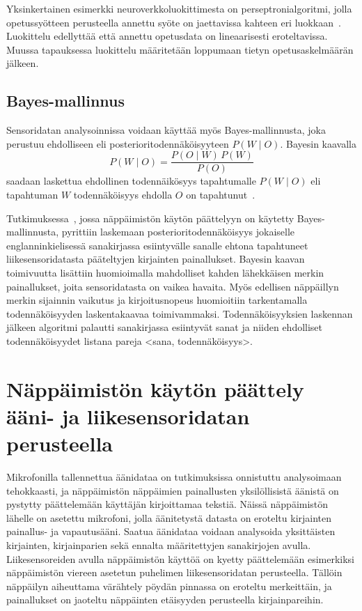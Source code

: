 \documentclass[finnish]{tktltiki2}
\theoremstyle{definition}
\theoremstyle{remark}
\begin{document}
Yksinkertainen esimerkki neuroverkkoluokittimesta on perseptronialgoritmi, jolla opetussyötteen perusteella annettu syöte on jaettavissa kahteen eri luokkaan~\cite{ert}. Luokittelu edellyttää että annettu opetusdata on lineaarisesti eroteltavissa. Muussa tapauksessa luokittelu määritetään loppumaan tietyn opetusaskelmäärän jälkeen.


\subsection{Bayes-mallinnus}
Sensoridatan analysoinnissa voidaan käyttää myös Bayes-mallinnusta, joka perustuu ehdolliseen eli posterioritodennäköisyyteen $ P(W \mid O)$. Bayesin kaavalla $$ P(W \mid O) = \frac{P(O \mid W) \, P(W)}{P(O)} $$ saadaan laskettua ehdollinen todennäikösyys tapahtumalle $ P(W \mid O)$ eli tapahtuman $W$ todennäköisyys ehdolla $O$ on tapahtunut~\cite{bar}.

Tutkimuksessa~\cite{mole}, jossa näppäimistön käytön päättelyyn on käytetty Bayes-mallinnusta, pyrittiin laskemaan posterioritodennäköisyys jokaiselle englanninkielisessä sanakirjassa esiintyvälle sanalle ehtona tapahtuneet liikesensoridatasta pääteltyjen kirjainten painallukset. Bayesin kaavan toimivuutta lisättiin huomioimalla mahdolliset kahden lähekkäisen merkin painallukset, joita sensoridatasta on vaikea havaita. Myös edellisen näppäillyn merkin sijainnin vaikutus ja kirjoitusnopeus huomioitiin tarkentamalla todennäköisyyden laskentakaavaa toimivammaksi. Todennäköisyyksien laskennan jälkeen algoritmi palautti sanakirjassa esiintyvät sanat ja niiden ehdolliset todennäköisyydet listana pareja <sana, todennäköisyys>.


\section{Näppäimistön käytön päättely ääni- ja liikesensoridatan perusteella}
Mikrofonilla tallennettua äänidataa on tutkimuksissa onnistuttu analysoimaan tehokkaasti, ja näppäimistön näppäimien painallusten yksilöllisistä äänistä on pystytty päättelemään käyttäjän kirjoittamaa tekstiä. Näissä näppäimistön lähelle on asetettu mikrofoni, jolla äänitetystä datasta on eroteltu kirjainten painallus- ja vapautusääni. Saatua äänidataa voidaan analysoida yksittäisten kirjainten, kirjainparien sekä ennalta määritettyjen sanakirjojen avulla. 
Liikesensoreiden avulla näppäimistön käyttöä on kyetty päättelemään esimerkiksi näppäimistön viereen asetetun puhelimen liikesensoridatan perusteella. Tällöin näppäilyn aiheuttama värähtely pöydän pinnassa on eroteltu merkeittäin, ja painallukset on jaoteltu näppäinten etäisyyden perusteella kirjainpareihin.
\end{document}
